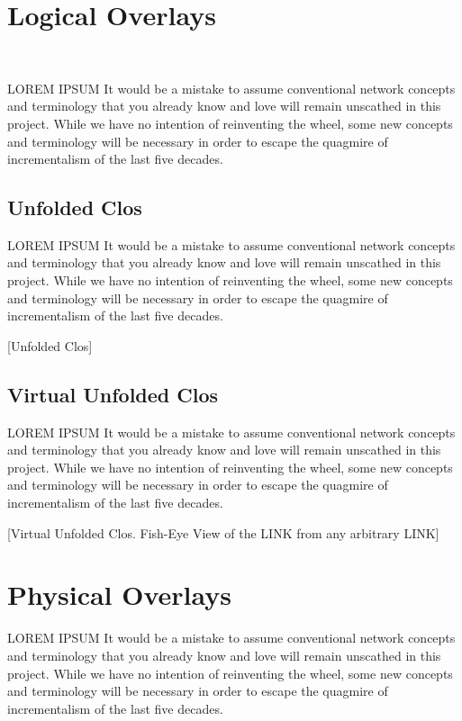 \documentclass[../../../OAE-SPEC-MAIN.tex]{subfiles}
\begin{document}
\section{Logical Overlays}\

LOREM IPSUM It would be a mistake to assume conventional network concepts and terminology that you already know and love will remain unscathed in this project. While we have no intention of reinventing the wheel,  some new concepts and terminology will be necessary in order to escape the quagmire of incrementalism of the last five decades.  

\subsection{Unfolded Clos}

LOREM IPSUM It would be a mistake to assume conventional network concepts and terminology that you already know and love will remain unscathed in this project. While we have no intention of reinventing the wheel,  some new concepts and terminology will be necessary in order to escape the quagmire of incrementalism of the last five decades.  

[Unfolded Clos]

\subsection{Virtual Unfolded Clos}

LOREM IPSUM It would be a mistake to assume conventional network concepts and terminology that you already know and love will remain unscathed in this project. While we have no intention of reinventing the wheel,  some new concepts and terminology will be necessary in order to escape the quagmire of incrementalism of the last five decades.  

[Virtual Unfolded Clos. Fish-Eye View of the LINK from any arbitrary LINK]


\section{Physical Overlays}

LOREM IPSUM It would be a mistake to assume conventional network concepts and terminology that you already know and love will remain unscathed in this project. While we have no intention of reinventing the wheel,  some new concepts and terminology will be necessary in order to escape the quagmire of incrementalism of the last five decades.  
\end{document}
